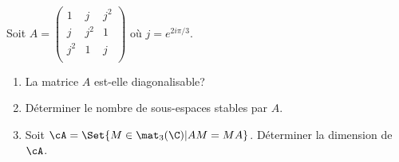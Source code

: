 \begin{enonce}
\begin{exercise}[ID={RMS130 E646},subtitle={Mines-Ponts PSI 2019},tags={}, difficulty={0}]
  Soit $A= \begin{pmatrix} 1&j&j^2\\ j&j^2&1\\ j^2&1&j\\ \end{pmatrix}$ où $j=e^{2i\pi / 3}$.
  \begin{enumerate}
    \item La matrice $A$ est-elle diagonalisable?
    \item Déterminer le nombre de sous-espaces stables par $A$.
    \item Soit $\cA = \Set{M\in\mat_3(\C) | AM=MA}$. Déterminer la dimension de $\cA$.
  \end{enumerate}
\end{exercise}
\begin{solution}
\end{solution}
\end{enonce}

